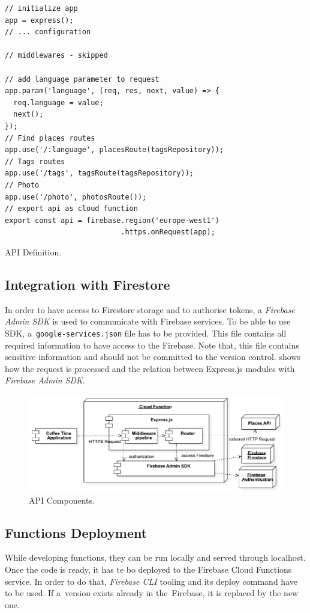 \begin{listing}[ht]
\begin{verbatim}
// initialize app
app = express();
// ... configuration

// middlewares - skipped

// add language parameter to request
app.param('language', (req, res, next, value) => {
  req.language = value;
  next();
});
// Find places routes
app.use('/:language', placesRoute(tagsRepository));
// Tags routes
app.use('/tags', tagsRoute(tagsRepository));
// Photo
app.use('/photo', photosRoute());
// export api as cloud function
export const api = firebase.region('europe-west1')
                           .https.onRequest(app);
\end{verbatim}
\caption{API Definition.}
\label{listing:cta-index}
\end{listing}

\subsection{Integration with Firestore}
In order to have access to Firestore storage and to authorise tokens, a \textit{Firebase Admin SDK} is used to communicate with Firebase services. To be able to use SDK, a~\verb|google-services.json| file has to be provided. This file contains all required information to have access to the Firebase. Note that, this file contains sensitive information and should not be committed to the version control.  shows how the request is processed and the relation between Express.js modules with \textit{Firebase Admin SDK}.

\begin{figure}[ht]
    \centering
    \includegraphics[width=\linewidth]{img/implementation/coffee-api-components.pdf}
    \caption{API Components.}
    \label{fig:cta-relations}
\end{figure}

\subsection{Functions Deployment}
While developing functions, they can be run locally and served through localhost. Once the code is ready, it has te bo deployed to the Firebase Cloud Functions service. In order to do that, \textit{Firebase CLI} tooling and its deploy command have to be used. If a~version exists already in the~Firebase, it is replaced by the new one.

